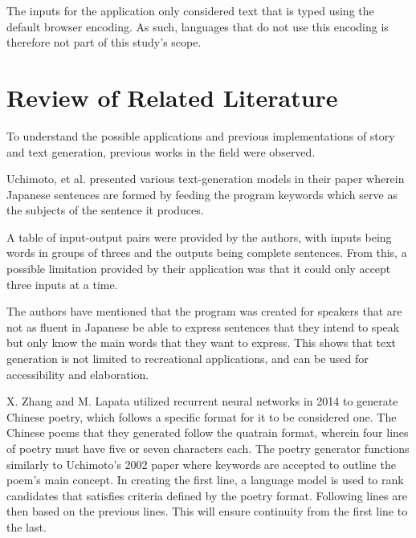 \documentclass[journal]{./IEEE/IEEEtran}
\begin{document}
The inputs for the application only considered text that is typed using the default browser encoding. As such, languages that do not use this encoding is therefore not part of this study's scope.

\section{Review of Related Literature}

To understand the possible applications and previous implementations of story and text generation, previous works in the field were observed.
\pubidadjcol

Uchimoto, et al. presented various text-generation models in their paper wherein Japanese sentences are formed by feeding the program keywords which serve as the subjects of the sentence it produces. \cite{UKIHSS2002} 

A table of input-output pairs were provided by the authors, with inputs being words in groups of threes and the outputs being complete sentences. From this, a possible limitation provided by their application was that it could only accept three inputs at a time.

The authors have mentioned that the program was created for speakers that are not as fluent in Japanese be able to express sentences that they intend to speak but only know the main words that they want to express. This shows that text generation is not limited to recreational applications, and can be used for accessibility and elaboration. %

X. Zhang and M. Lapata utilized recurrent neural networks in 2014 to generate Chinese poetry, which follows a specific format for it to be considered one.
\cite{ZXLM2014}
The Chinese poems that they generated follow the quatrain format, wherein four lines of poetry must have five or seven characters each.
The poetry generator functions similarly to Uchimoto's 2002 paper where keywords are accepted to outline the poem's main concept.
In creating the first line, a language model is used to rank candidates that satisfies criteria defined by the poetry format. Following lines are then based on the previous lines. This will ensure continuity from the first line to the last.
\end{document}
